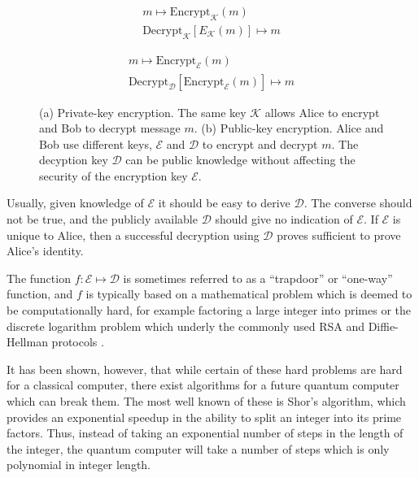 \begin{figure}[htp]
\centering
\captionsetup{width=0.8\linewidth}
\begin{framed}
\begin{subfigure}{0.4\textwidth}
\begin{align*}
m \mapsto \text{Encrypt}_\mathcal{K}\left(m\right) \\
\text{Decrypt}_\mathcal{K}\left[E_\mathcal{K}\left(m\right)\right] \mapsto m
\end{align*}
\caption{}
\end{subfigure}
\begin{subfigure}{0.4\textwidth}
\begin{align*}
m \mapsto \text{Encrypt}_\mathcal{E}\left(m\right) \\
\text{Decrypt}_\mathcal{D}\left[\text{Encrypt}_\mathcal{E}\left(m\right)\right] \mapsto m
\end{align*}
\caption{}
\end{subfigure}
\caption{(a) Private-key encryption. The same key $\mathcal{K}$ allows Alice to encrypt and Bob to decrypt message $m$. (b) Public-key encryption. Alice and Bob use different keys, $\mathcal{E}$ and $\mathcal{D}$ to encrypt and decrypt $m$. The decyption key $\mathcal{D}$ can be public knowledge without affecting the security of the encryption key $\mathcal{E}$.}
\label{fig:pubpriv}
\end{framed}
\end{figure}

Usually, given knowledge of $\mathcal{E}$ it should be easy to derive $\mathcal{D}$. The converse should not be true, and the publicly available $\mathcal{D}$ should give no indication of $\mathcal{E}$. If $\mathcal{E}$ is unique to Alice, then a successful decryption using $\mathcal{D}$ proves sufficient to prove Alice's identity.%

The function $f: \mathcal{E} \mapsto \mathcal{D}$ is sometimes referred to as a ``trapdoor'' or ``one-way'' function, and $f$ is typically based on a mathematical problem which is deemed to be computationally hard, for example factoring a large integer into primes or the discrete logarithm problem which underly the commonly used RSA \cite{Rivest1978} and Diffie-Hellman \cite{Diffie1976} protocols \cite{Schneier1996}.


It has been shown, however, that while certain of these hard problems are hard for a classical computer, there exist algorithms for a future quantum computer which can break them. The most well known of these is Shor's algorithm, \cite{Shor1997} which provides an exponential speedup in the ability to split an integer into its prime factors. Thus, instead of taking an exponential number of steps in the length of the integer, the quantum computer will take a number of steps which is only polynomial in integer length. 

